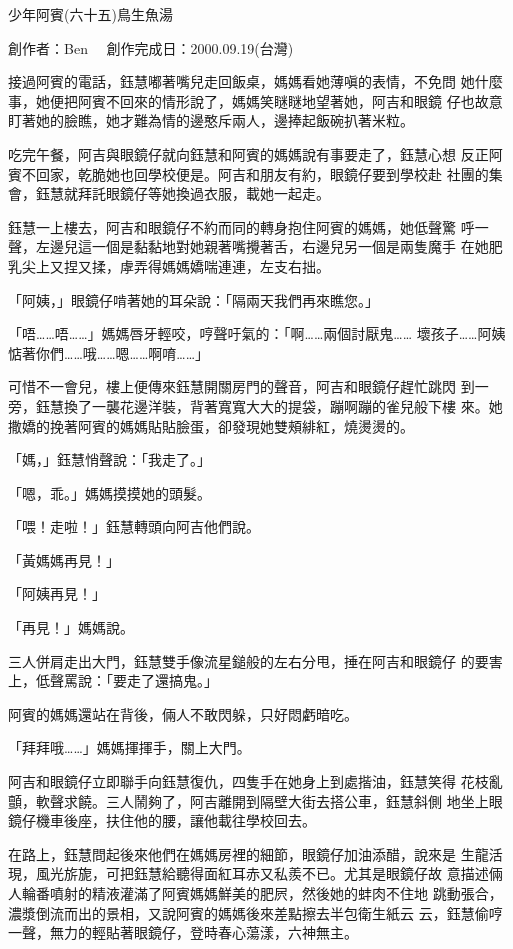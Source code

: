 



少年阿賓(六十五)鳥生魚湯

創作者：Ben　
創作完成日：2000.09.19(台灣)


接過阿賓的電話，鈺慧嘟著嘴兒走回飯桌，媽媽看她薄嗔的表情，不免問
她什麼事，她便把阿賓不回來的情形說了，媽媽笑瞇瞇地望著她，阿吉和眼鏡
仔也故意盯著她的臉瞧，她才難為情的邊憨斥兩人，邊捧起飯碗扒著米粒。

吃完午餐，阿吉與眼鏡仔就向鈺慧和阿賓的媽媽說有事要走了，鈺慧心想
反正阿賓不回家，乾脆她也回學校便是。阿吉和朋友有約，眼鏡仔要到學校赴
社團的集會，鈺慧就拜託眼鏡仔等她換過衣服，載她一起走。

鈺慧一上樓去，阿吉和眼鏡仔不約而同的轉身抱住阿賓的媽媽，她低聲驚
呼一聲，左邊兒這一個是黏黏地對她親著嘴攪著舌，右邊兒另一個是兩隻魔手
在她肥乳尖上又捏又揉，虖弄得媽媽嬌喘連連，左支右拙。

「阿姨，」眼鏡仔啃著她的耳朵說：「隔兩天我們再來瞧您。」

「唔……唔……」媽媽唇牙輕咬，哼聲吁氣的：「啊……兩個討厭鬼……
壞孩子……阿姨惦著你們……哦……嗯……啊唷……」

可惜不一會兒，樓上便傳來鈺慧開關房門的聲音，阿吉和眼鏡仔趕忙跳閃
到一旁，鈺慧換了一襲花邊洋裝，背著寬寬大大的提袋，蹦啊蹦的雀兒般下樓
來。她撒嬌的挽著阿賓的媽媽貼貼臉蛋，卻發現她雙頰緋紅，燒燙燙的。

「媽，」鈺慧悄聲說：「我走了。」

「嗯，乖。」媽媽摸摸她的頭髮。

「喂！走啦！」鈺慧轉頭向阿吉他們說。

「黃媽媽再見！」

「阿姨再見！」

「再見！」媽媽說。

三人併肩走出大門，鈺慧雙手像流星鎚般的左右分甩，捶在阿吉和眼鏡仔
的要害上，低聲罵說：「要走了還搞鬼。」

阿賓的媽媽還站在背後，倆人不敢閃躲，只好悶虧暗吃。

「拜拜哦……」媽媽揮揮手，關上大門。

阿吉和眼鏡仔立即聯手向鈺慧復仇，四隻手在她身上到處揩油，鈺慧笑得
花枝亂顫，軟聲求饒。三人鬧夠了，阿吉離開到隔壁大街去搭公車，鈺慧斜側
地坐上眼鏡仔機車後座，扶住他的腰，讓他載往學校回去。

在路上，鈺慧問起後來他們在媽媽房裡的細節，眼鏡仔加油添醋，說來是
生龍活現，風光旂旎，可把鈺慧給聽得面紅耳赤又私羨不已。尤其是眼鏡仔故
意描述倆人輪番噴射的精液灌滿了阿賓媽媽鮮美的肥屄，然後她的蚌肉不住地
跳動張合，濃漿倒流而出的景相，又說阿賓的媽媽後來差點擦去半包衛生紙云
云，鈺慧偷哼一聲，無力的輕貼著眼鏡仔，登時春心蕩漾，六神無主。

